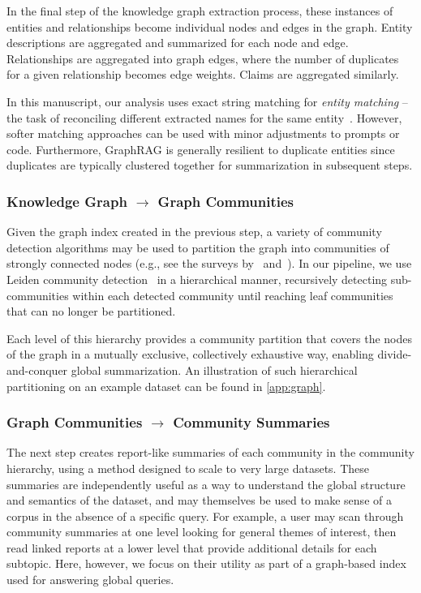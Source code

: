 \documentclass{article}
\begin{document}
In the final step of the knowledge graph extraction process, these instances of entities and relationships become individual nodes and edges in the graph.
Entity descriptions are aggregated and summarized for each node and edge.
Relationships are aggregated into graph edges, where the number of duplicates for a given relationship becomes edge weights.
Claims are aggregated similarly.

In this manuscript, our analysis uses exact string matching for \emph{entity matching} -- the task of reconciling different extracted names for the same entity~\citep{barlaug2021neural, christen2012data, elmagarmid2006duplicate}. 
However, softer matching approaches can be used with minor adjustments to prompts or code.
Furthermore, GraphRAG is generally resilient to duplicate entities since duplicates are typically clustered together for summarization in subsequent steps.

\subsubsection{Knowledge Graph \texorpdfstring{$\rightarrow$}{-->} Graph Communities}

Given the graph index created in the previous step, a variety of community detection algorithms may be used to partition the graph into communities of strongly connected nodes (e.g., see the surveys by~\citet{fortunato2010community} and~\citet{jin2021survey}).
In our pipeline, we use Leiden community detection~\citep{Traag2019Leiden} in a hierarchical manner, recursively detecting sub-communities within each detected community until reaching leaf communities that can no longer be partitioned. 

Each level of this hierarchy provides a community partition that covers the nodes of the graph in a mutually exclusive, collectively exhaustive way, enabling divide-and-conquer global summarization.
An illustration of such hierarchical partitioning on an example dataset can be found in \autoref{app:graph}.

\subsubsection{Graph Communities \texorpdfstring{$\rightarrow$}{-->} Community Summaries}
The next step creates report-like summaries of each community in the community hierarchy, using a method designed to scale to very large datasets.
These summaries are independently useful as a way to understand the global structure and semantics of the dataset, and may themselves be used to make sense of a corpus in the absence of a specific query.
For example, a user may scan through community summaries at one level looking for general themes of interest, then read linked reports at a lower level that provide additional details for each subtopic.
Here, however, we focus on their utility as part of a graph-based index used for answering global queries.
\end{document}
